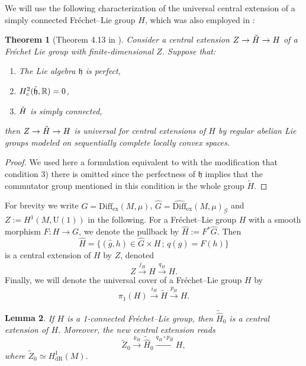 \documentclass{article}
\newcommand{\ex}{\mathrm{ex}}
\newcommand{\dR}{\mathrm{dR}}
\newcommand{\Diff}{\mathrm{Diff}}
\newcommand{\cG}{\mathcal{G}}
\newcommand{\U}{\mathrm{U}}
\newtheorem{Theorem}{Theorem}[section]
\newtheorem{Lemma}[Theorem]{Lemma}
\theoremstyle{definition}
\begin{document}
We will use the following characterization of the universal central extension of a simply connected Fr\'echet--Lie group $H$, which was also employed in \cite[Theorem 7.1]{janssensHowActionThat2024}:
\begin{Theorem}[Theorem 4.13 in \cite{Neeb2002}]\label{neebcor}
	Consider a central extension $Z\to \Check{H}\to H$ of a Fréchet Lie group with finite-dimensional $Z$. Suppose that:
	\begin{enumerate}
		\item The Lie algebra $\mathfrak h$ is perfect,
		\item $H^2_c(\Check{\mathfrak h},\mathbb R)=0$,
		\item $\Check{H}$ is simply connected,
	\end{enumerate}
	then $Z\to \Check{H}\to H$  is universal for central extensions of $H$ by regular abelian Lie groups modeled on sequentially complete locally convex spaces.
\end{Theorem}
\begin{proof}
We used here a formulation equivalent to \cite[Theorem 7.1]{janssensHowActionThat2024} with the modification that condition 3) there is omitted since the perfectness of $\mathfrak h$ implies that the commutator group mentioned in this condition is the whole group $\tilde H$. 
\end{proof}

For brevity we write $G=\Diff_{\ex}(M,\mu)$, $\widehat{G}=\widehat{\Diff}_{\ex}(M,\mu)_{\cG}$ and $Z := H^1(M,\U(1))$ in the following.
For a Fr\'echet--Lie group $H$ with a smooth morphism $F \colon H \rightarrow G$, 
we denote the pullback by $\widehat{H} := F^*\widehat{G}$. Then
\begin{equation}\label{eq:bullbackCE}
\widehat{H} = \{(\hat{g},h) \in  \widehat{G} \times H\,;\,  q(\hat{g}) = F(h)\}
\end{equation}
is a central extension of $H$ by $Z$, denoted
\begin{equation}\label{eq:baseq}
Z\overset{j_H}{\longrightarrow}\widehat{H}\overset{q_H}{\longrightarrow} H.
\end{equation}
Finally, we will denote the universal cover of a Fr\'echet--Lie group $H$ by
\[
\pi_1(H)\overset{i_H}{\longrightarrow}\tilde H\overset{p_H}{\longrightarrow} H.
\]

\begin{Lemma}\label{lem:exx}
If $H$ is a 1-connected Fr\'echet--Lie group, then
$\tilde{\hat H}_0$ is a central extension of $H$. Moreover, the new central extension reads
    $$\tilde Z_0\overset{k_H}{\longrightarrow} \tilde {\hat H}_0\overset{q_{H}\circ p_{\hat H}}{\longrightarrow} H,$$
    where $\widetilde{Z}_0 \simeq H^1_{\dR}(M)$. 
\end{Lemma}
\end{document}
